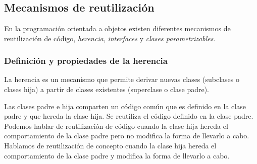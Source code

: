 \documentclass[10pt, a4paper]{article}
\newif\IfInSansMode
\begin{document}

\thispagestyle{empty}
\tableofcontents
\newpage



\section{}

\section{}

\section{}

\subsection{Mecanismos de reutilización}

En la programación orientada a objetos existen diferentes mecanismos de
reutilización de código, \textit{herencia}, \textit{interfaces} y
\textit{clases parametrizables}.

\subsubsection{}

\subsubsection{Definición y propiedades de la herencia}

La herencia es un mecanismo que permite derivar nuevas clases (subclases
o clases hija) a partir de clases existentes (superclase o clase padre).

Las clases padre e hija comparten un código común que es definido en la
clase padre y que hereda la clase hija. Se reutiliza el código definido
en la clase padre. Podemos hablar de reutilización de código cuando la
clase hija hereda el comportamiento de la clase padre pero no modifica
la forma de llevarlo a cabo. Hablamos de reutilización de concepto
cuando la clase hija hereda el comportamiento de la clase padre y
modifica la forma de llevarlo a cabo.
\end{document}
